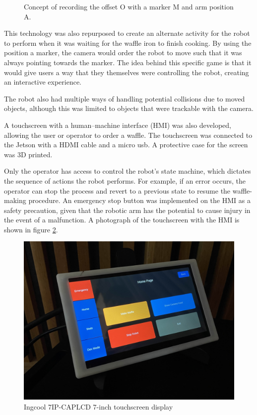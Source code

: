 \begin{figure}[h]
    \centering
    
    \caption{Concept of recording the offset O with a marker M and arm position A.}
    \label{fig:badExample}
\end{figure}
This technology was also repurposed to create an alternate activity for the robot to perform when it was waiting for the waffle iron to finish cooking. By using the position a marker, the camera would order the robot to move such that it was always pointing towards the marker. The idea behind this specific game is that it would give users a way that they themselves were controlling the robot, creating an interactive experience.

The robot also had multiple ways of handling potential collisions due to moved objects, although this was limited to objects that were trackable with the camera. 

A touchscreen with a human–machine interface (HMI) was also developed, allowing the user or operator to order a waffle. The touchscreen was connected to the Jetson with a HDMI cable and a micro usb. A protective case for the screen was 3D printed.

Only the operator has access to control the robot's state machine, which dictates the sequence of actions the robot performs. For example, if an error occurs, the operator can stop the process and revert to a previous state to resume the waffle-making procedure. An emergency stop button was implemented on the HMI as a safety precaution, given that the robotic arm has the potential to cause injury in the event of a malfunction. A photograph of the touchscreen with the HMI is shown in figure \ref{fig:touchscreen}.


\begin{figure}[h]
    \centering
    \includegraphics[width=1\linewidth]{figures/screen.jpg} 
    \caption{Ingcool 7IP-CAPLCD 7-inch touchscreen display}
    \label{fig:touchscreen}
\end{figure} 
